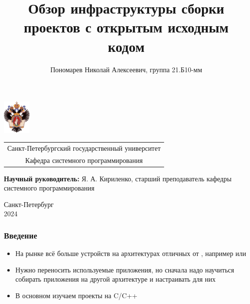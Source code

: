 \documentclass[aspectratio=169]{beamer}
\title[Обзор инфраструктуры сборки]{Обзор инфраструктуры сборки проектов с открытым исходным кодом}
\institute[СПбГУ]{}
\author[Николай Пономарев]{Пономарев Николай Алексеевич, группа 21.Б10-мм}
\begin{document}
{
\begin{frame}
	\includegraphics[width=1.4cm]{pictures/SPbGU_Logo.png}
	\vspace{-35pt}
	\hspace{-10pt}
	\begin{center}
		\begin{tabular}{c}
			\scriptsize{Санкт-Петербургский государственный университет} \\
			\scriptsize{Кафедра системного программирования}
		\end{tabular}
		\titlepage
	\end{center}

	\btVFill

	{\scriptsize
		\textbf{Научный руководитель:} Я. А. Кириленко, старший преподаватель кафедры системного программирования
	}
	\begin{center}
		\vspace{5pt}
		\scriptsize{Санкт-Петербург\\
			2024}
	\end{center}

\end{frame}
}

\begin{frame}[fragile]
	\frametitle{Введение}
	\begin{itemize}
		\item На рынке всё больше устройств на архитектурах отличных от \amd{}, например \riscv{} или \arm{}
		\item Нужно переносить используемые приложения, но сначала надо научиться собирать приложения на другой архитектуре и настраивать \ci{} для них
		\item В основном изучаем проекты на \textsc{C/C++}
	\end{itemize}
\end{frame}
\end{document}
